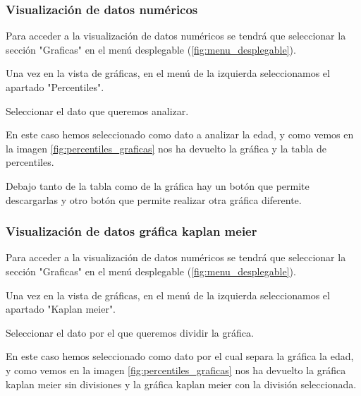 
\subsubsection{Visualización de datos numéricos}

Para acceder a la visualización de datos numéricos se tendrá que seleccionar la sección "Graficas"{} en el menú desplegable (\ref{fig:menu_desplegable}).


Una vez en la vista de gráficas, en el menú de la izquierda seleccionamos el apartado "Percentiles".


Seleccionar el dato que queremos analizar.


En este caso hemos seleccionado como dato a analizar la edad, y como vemos en la imagen \ref{fig:percentiles_graficas} nos ha devuelto la gráfica y la tabla de percentiles.

Debajo tanto de la tabla como de la gráfica hay un botón que permite descargarlas y otro botón que permite realizar otra gráfica diferente.


\subsubsection{Visualización de datos gráfica kaplan meier}

Para acceder a la visualización de datos numéricos se tendrá que seleccionar la sección "Graficas"{} en el menú desplegable (\ref{fig:menu_desplegable}).


Una vez en la vista de gráficas, en el menú de la izquierda seleccionamos el apartado "Kaplan meier".


Seleccionar el dato por el que queremos dividir la gráfica.


En este caso hemos seleccionado como dato por el cual separa la gráfica la edad, y como vemos en la imagen \ref{fig:percentiles_graficas} nos ha devuelto la gráfica kaplan meier sin divisiones y la gráfica kaplan meier con la división seleccionada.

